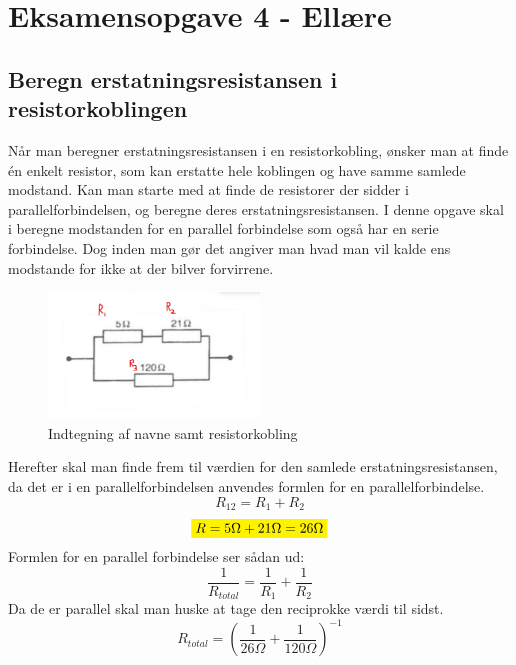 \newpage
\section{Eksamensopgave 4 - Ellære}
\subsection{Beregn erstatningsresistansen i resistorkoblingen}
Når man beregner erstatningsresistansen i en resistorkobling, ønsker man at finde én enkelt resistor, som kan erstatte hele koblingen og have samme samlede modstand. Kan man starte med at finde de resistorer der sidder i parallelforbindelsen, og beregne deres erstatningsresistansen. 
I denne opgave skal i beregne modstanden for en parallel forbindelse som også har en serie forbindelse. Dog inden man gør det angiver man hvad man vil kalde ens modstande for ikke at der bilver forvirrene.\newline
\begin{figure}[h!]
    \centering
    \includegraphics[width=0.5\textwidth]{figures/resistans.png}
    \caption{Indtegning af navne samt resistorkobling}
\end{figure}
Herefter skal man finde frem til værdien for den samlede erstatningsresistansen, da det er i en parallelforbindelsen anvendes formlen for en parallelforbindelse.
\begin{equation*} %
    R_{12}=R_{1}+R_{2}
\end{equation*}
\begin{equation*}
    \mathcolorbox{yellow}{R=5\Omega+21\Omega=26\Omega}
\end{equation*}
Formlen for en parallel forbindelse ser sådan ud:
\begin{equation*}
    \frac{1}{R_{total}}=\frac{1}{R_{1}}+\frac{1}{R_{2}}
\end{equation*}
Da de er parallel skal man huske at tage den reciprokke værdi til sidst.
\begin{equation*}
    R_{total}=\left(\frac{1}{26\Omega}+\frac{1}{120\Omega}\right)^{-1}
\end{equation*}

